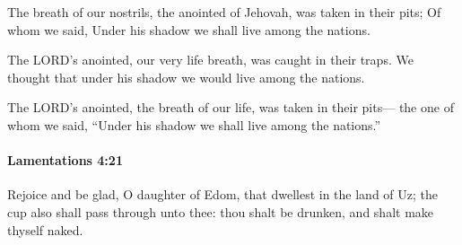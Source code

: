 			\begin{versebox}
					\item[BHS] 
					\item[LXX] 
					\item[ASV] The breath of our nostrils, the anointed of Jehovah, was taken in their pits; Of whom we said, Under his shadow we shall live among the nations.
					\item[NIV] The LORD’s anointed, our very life breath, was caught in their traps. We thought that under his shadow we would live among the nations.
					\item[NRSV] The LORD’s anointed, the breath of our life, was taken in their pits— the one of whom we said, “Under his shadow we shall live among the nations.”
			\end{versebox}

		\paragraph{Lamentations 4:21} %
			\label{LAMENTATIONS-4-21}

			Rejoice and be glad, O daughter of Edom, that dwellest in the land of Uz; the cup also shall pass through unto thee: thou shalt be drunken, and shalt make thyself naked.

